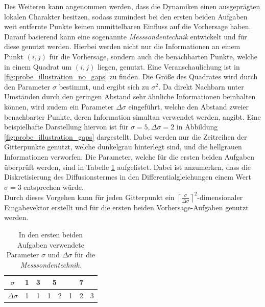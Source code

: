 Des Weiteren kann angenommen werden, dass die Dynamiken einen ausgeprägten lokalen Charakter besitzen, sodass zumindest bei den ersten beiden Aufgaben weit entfernte Punkte keinen unmittelbaren Einfluss auf die Vorhersage haben. Darauf basierend kann eine sogenannte \textit{Messsondentechnik} entwickelt und für diese genutzt werden. Hierbei werden nicht nur die Informationen an einem Punkt $(i, j)$ für die Vorhersage, sondern auch die benachbarten Punkte, welche in einem Quadrat um $(i, j)$ liegen, genutzt. Eine Veranschaulichung ist in \ref{fig:probe_illustration_no_gaps} zu finden. Die Größe des Quadrates wird durch den Parameter $\sigma$ bestimmt, und ergibt sich zu $\sigma^2$. Da direkt Nachbarn unter Umständen durch den geringen Abstand sehr ähnliche Informationen beinhalten können, wird zudem ein Parameter $\Delta \sigma$ eingeführt, welche den Abstand zweier benachbarter Punkte, deren Information simultan verwendet werden, angibt. Eine beispielhafte Darstellung hiervon ist für $\sigma = 5, \Delta \sigma=2$ in Abbildung \ref{fig:probe_illustration_gaps} dargestellt. Dabei werden nur die Zeitreihen der Gitterpunkte genutzt, welche dunkelgrau hinterlegt sind, und die hellgrauen Informationen verworfen. Die Parameter, welche für die ersten beiden Aufgaben überprüft werden, sind in Tabelle \ref{tab:probe_sigma_values} aufgelistet. Dabei ist anzumerken, dass die Diskretisierung des Diffusionstermes in den Differentialgleichungen einem Wert $\sigma=3$ entsprechen würde.\\
Durch dieses Vorgehen kann für jeden Gitterpunkt ein ${\left \lceil{\frac{\sigma}{\Delta \sigma}}\right \rceil}^2$-dimensionaler Eingabevektor erstellt und für die ersten beiden Vorhersage-Aufgaben genutzt werden.\\

\begin{table}[h]
\centering
\begin{tabular}{cc|c|c|c|c|c|c}
\hline
$\sigma$ & 1 & 3 & \multicolumn{2}{c|}{5} & \multicolumn{3}{c}{7} \\
\hline
$\Delta \sigma$ & 1 & 1 & 1 & 2 & 1 & 2 & 3 \\
\hline
\end{tabular} 
\caption{In den ersten beiden Aufgaben verwendete Parameter $\sigma$ und $\Delta \sigma$ für die \textit{Messsondentechnik}.}
\label{tab:probe_sigma_values}
\end{table} 

